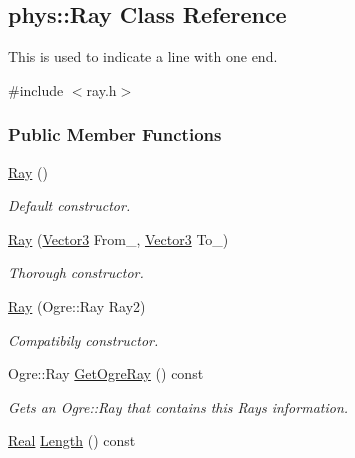 \hypertarget{classphys_1_1Ray}{
\subsection{phys::Ray Class Reference}
\label{df/d57/classphys_1_1Ray}
}


This is used to indicate a line with one end.  




{\ttfamily \#include $<$ray.h$>$}

\subsubsection*{Public Member Functions}
\begin{DoxyCompactItemize}
\item 
\hyperlink{classphys_1_1Ray_a35f4f5eec653ea561353163eaad672d3}{Ray} ()
\begin{DoxyCompactList}\small\item\em Default constructor. \item\end{DoxyCompactList}\item 
\hyperlink{classphys_1_1Ray_aa6123ef37a2351e6cca3954c23212379}{Ray} (\hyperlink{classphys_1_1Vector3}{Vector3} From\_\-, \hyperlink{classphys_1_1Vector3}{Vector3} To\_\-)
\begin{DoxyCompactList}\small\item\em Thorough constructor. \item\end{DoxyCompactList}\item 
\hyperlink{classphys_1_1Ray_a395485ffe19e6a53966730c01a2781c1}{Ray} (Ogre::Ray Ray2)
\begin{DoxyCompactList}\small\item\em Compatibily constructor. \item\end{DoxyCompactList}\item 
Ogre::Ray \hyperlink{classphys_1_1Ray_a0c29b1a55f42ff60d224f16cc0910cdb}{GetOgreRay} () const 
\begin{DoxyCompactList}\small\item\em Gets an Ogre::Ray that contains this Rays information. \item\end{DoxyCompactList}\item 
\hyperlink{namespacephys_af7eb897198d265b8e868f45240230d5f}{Real} \hyperlink{classphys_1_1Ray_add544025fcd6d1cdcfed3c0413b3701b}{Length} () const 

\end{DoxyCompactItemize}
